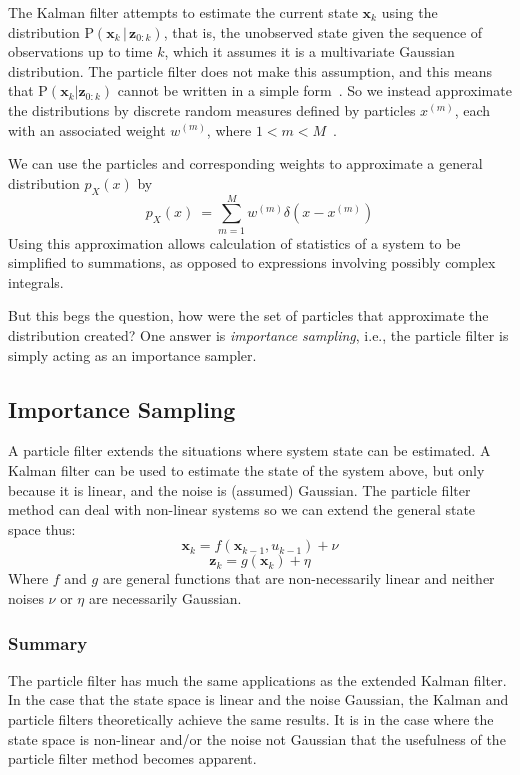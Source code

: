 \documentclass[11pt]{article}
\begin{document}
The Kalman filter attempts to estimate the current state $\mathbf{x}_{k}$ using
the distribution $\textrm{P}(\mathbf{x}_{k}\,|\,\mathbf{z}_{0:k})$, that is, the
unobserved state given the sequence of observations up to time $k$, which
it assumes it is a multivariate Gaussian distribution. The particle filter does
not make this assumption, and this means that
$\textrm{P}(\mathbf{x}_{k}|\mathbf{z}_{0:k})$ cannot be written in a simple
form~{\cite{ref:1}}. So we instead approximate the distributions
by discrete random measures defined by particles $x^{(m)}$, each with an
associated weight $w^{(m)}$, where $1 < m < M$~{\cite{ref:2}}.

We can use the particles and corresponding weights to approximate a general
distribution $p_{X}(x)$ by
\begin{equation}
p_{X}(x) ~= \sum\limits_{m=1}^{M}{w^{(m)}\delta(x-x^{(m)})}
\end{equation}
Using this approximation allows calculation of statistics of a system to be
simplified to summations, as opposed to expressions involving possibly complex
integrals. 

But this begs the question, how were the set of particles that approximate the
distribution created? One answer is \emph{importance sampling}, i.e., the
particle filter is simply acting as an importance sampler.

\subsection{Importance Sampling}

A particle filter extends the situations where system state can be estimated. A
Kalman filter can be used to estimate the state of the system above, but only
because it is linear, and the noise is (assumed) Gaussian. The particle filter
method can deal with non-linear systems so we can extend the general state
space thus:
\begin{equation}
\mathbf{x}_{k} = f(\mathbf{x}_{k-1}, u_{k-1}) + \nu
\end{equation}
\begin{equation}
\mathbf{z}_{k} = g(\mathbf{x}_{k}) + \eta
\end{equation}
Where $f$ and $g$ are general functions that are non-necessarily linear and
neither noises $\nu$ or $\eta$ are necessarily Gaussian.

\subsubsection{Summary}
The particle filter has much the same applications as the extended Kalman
filter. In the case that the state space is linear and the noise Gaussian, the
Kalman and particle filters theoretically achieve the same results. It is in
the case where the state space is non-linear and/or the noise not Gaussian that
the usefulness of the particle filter method becomes apparent.
\end{document}
